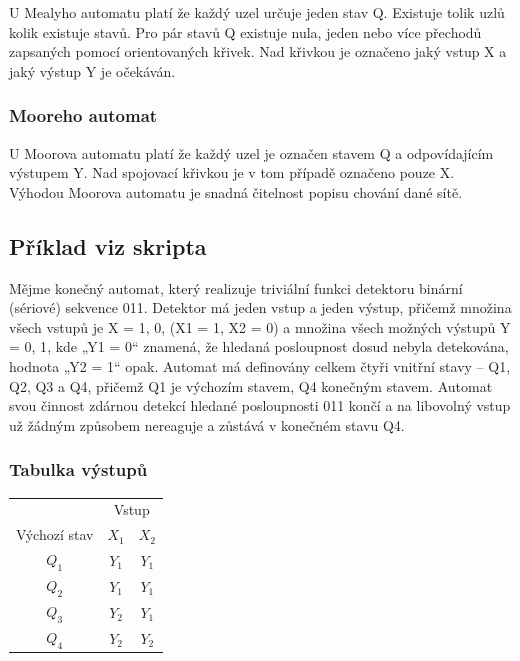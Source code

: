 U Mealyho automatu platí že každý uzel určuje jeden stav Q.
Existuje tolik uzlů kolik existuje stavů.
Pro pár stavů Q existuje nula, jeden nebo více přechodů zapsaných pomocí orientovaných křivek.
Nad křivkou je označeno jaký vstup X a jaký výstup Y je očekáván.

\subsubsection{Mooreho automat}

U Moorova automatu platí že každý uzel je označen stavem Q a odpovídajícím výstupem Y.
Nad spojovací křivkou je v tom případě označeno pouze X.
Výhodou Moorova automatu je snadná čitelnost popisu chování dané sítě.


\subsection{Příklad viz skripta}


Mějme konečný automat, který realizuje triviální funkci detektoru binární (sériové)
sekvence 011.
Detektor má jeden vstup a jeden výstup, přičemž množina všech vstupů je X = {1, 0}, (X1 = 1, X2 = 0) a množina všech možných výstupů Y = {0, 1}, kde „Y1 = 0“ znamená, že hledaná posloupnost dosud nebyla detekována, hodnota „Y2 = 1“ opak.
Automat má definovány celkem čtyři vnitřní stavy – Q1, Q2, Q3 a Q4, přičemž Q1 je výchozím stavem, Q4 konečným stavem.
Automat svou činnost zdárnou detekcí hledané posloupnosti 011 končí a na libovolný vstup už žádným způsobem nereaguje a zůstává v konečném stavu Q4.

\subsubsection{Tabulka výstupů}

\begin{table}[ht]
    \begin{tabular}{ccc}
    \hline
                 & \multicolumn{2}{c}{Vstup} \\
    Výchozí stav & $X_1$       & $X_2$       \\\hline
    $Q_1$        & $Y_1$       & $Y_1$       \\
    $Q_2$        & $Y_1$       & $Y_1$       \\
    $Q_3$        & $Y_2$       & $Y_1$       \\
    $Q_4$        & $Y_2$       & $Y_2$       \\\hline
    \end{tabular}
\end{table}

